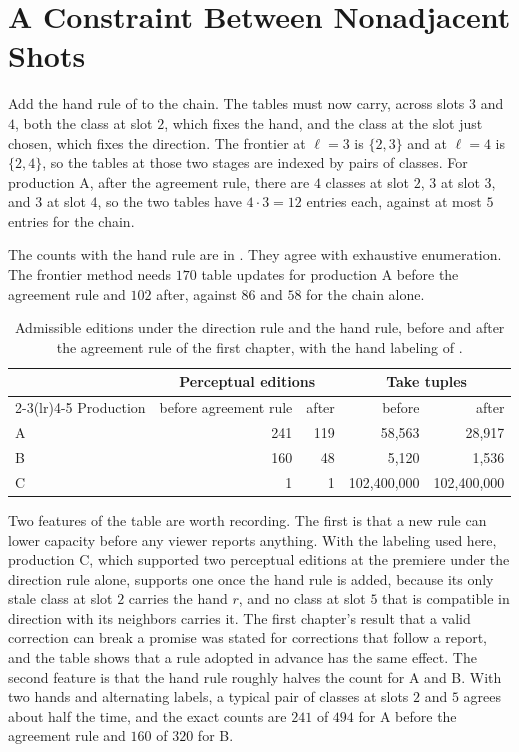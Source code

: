 \documentclass[11pt,twoside,openright]{book}
\theoremstyle{plain}
\theoremstyle{definition}
\theoremstyle{remark}
\begin{document}
\section{A Constraint Between Nonadjacent Shots}\label{sec:glass}

Add the hand rule of  to the chain. The tables must now carry, across slots $3$ and $4$, both the class at slot $2$, which fixes the hand, and the class at the slot just chosen, which fixes the direction. The frontier at $\ell=3$ is $\{2,3\}$ and at $\ell=4$ is $\{2,4\}$, so the tables at those two stages are indexed by pairs of classes. For production A, after the agreement rule, there are $4$ classes at slot $2$, $3$ at slot $3$, and $3$ at slot $4$, so the two tables have $4\cdot3=12$ entries each, against at most $5$ entries for the chain.

The counts with the hand rule are in . They agree with exhaustive enumeration. The frontier method needs $170$ table updates for production A before the agreement rule and $102$ after, against $86$ and $58$ for the chain alone.

\begin{table}[ht]
\centering
\begin{tabular}{@{}lrrrr@{}}
\toprule
 & \multicolumn{2}{c}{Perceptual editions} & \multicolumn{2}{c}{Take tuples}\\
\cmidrule(lr){2-3}\cmidrule(lr){4-5}
Production & before agreement rule & after & before & after\\
\midrule
A & 241 & 119 & 58,563 & 28,917\\
B & 160 & 48 & 5,120 & 1,536\\
C & 1 & 1 & 102,400,000 & 102,400,000\\
\bottomrule
\end{tabular}
\caption{Admissible editions under the direction rule and the hand rule, before and after the agreement rule of the first chapter, with the hand labeling of .}\label{tab:glasscounts}
\end{table}

Two features of the table are worth recording. The first is that a new rule can lower capacity before any viewer reports anything. With the labeling used here, production C, which supported two perceptual editions at the premiere under the direction rule alone, supports one once the hand rule is added, because its only stale class at slot $2$ carries the hand $r$, and no class at slot $5$ that is compatible in direction with its neighbors carries it. The first chapter's result that a valid correction can break a promise was stated for corrections that follow a report, and the table shows that a rule adopted in advance has the same effect. The second feature is that the hand rule roughly halves the count for A and B. With two hands and alternating labels, a typical pair of classes at slots $2$ and $5$ agrees about half the time, and the exact counts are $241$ of $494$ for A before the agreement rule and $160$ of $320$ for B.
\end{document}
